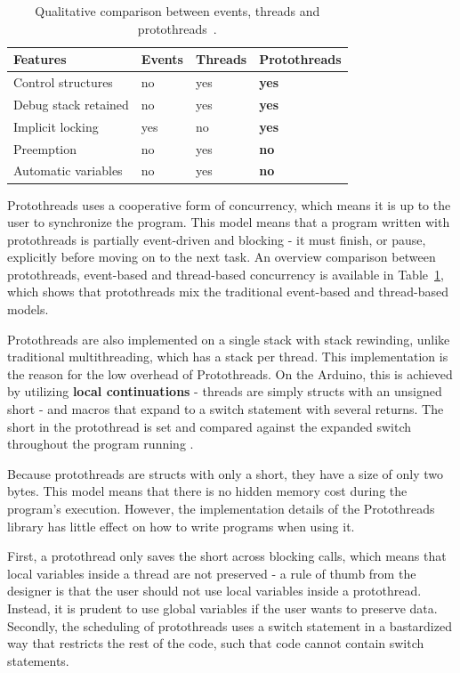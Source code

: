 \begin{table}[htb!]
  \centering
  \begin{tabular}{lll>{\bfseries}l}
    \toprule
    Features             & Events & Threads & Protothreads \\ \midrule
    Control structures   & no     & yes     & yes          \\
    Debug stack retained & no     & yes     & yes          \\
    Implicit locking     & yes    & no      & yes          \\
    Preemption           & no     & yes     & no           \\
    Automatic variables  & no     & yes     & no
  \end{tabular}
  \caption{Qualitative comparison between events, threads and protothreads~\cite{dunkels05using}.}
  \label{tab:protothreadscomparison}
\end{table}


Protothreads uses a cooperative form of concurrency, which means it is up to the user to synchronize the program. This model means that a program written with protothreads is partially event-driven and blocking - it must finish, or pause, explicitly before moving on to the next task. An overview comparison between protothreads, event-based and thread-based concurrency is available in Table~\ref{tab:protothreadscomparison}, which shows that protothreads mix the traditional event-based and thread-based models.

Protothreads are also implemented on a single stack with stack rewinding, unlike traditional multithreading, which has a stack per thread. This implementation is the reason for the low overhead of Protothreads. On the Arduino, this is achieved by utilizing \textbf{local continuations} - threads are simply structs with an unsigned short - and macros that expand to a switch statement with several returns. The short in the protothread is set and compared against the expanded switch throughout the program running \cite{AdamDunkelProtothreads}.




Because protothreads are structs with only a short, they have a size of only two bytes. This model means that there is no hidden memory cost during the program's execution. However, the implementation details of the Protothreads library has little effect on how to write programs when using it.

First, a protothread only saves the short across blocking calls, which means that local variables inside a thread are not preserved - a rule of thumb from the designer is that the user should not use local variables inside a protothread. Instead, it is prudent to use global variables if the user wants to preserve data.
Secondly, the scheduling of protothreads uses a switch statement in a bastardized way that restricts the rest of the code, such that code cannot contain switch statements.

